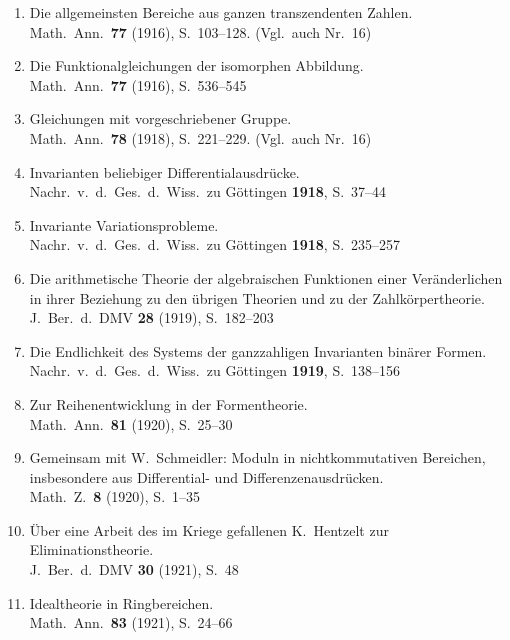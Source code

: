 \documentclass[12pt,a4paper]{article}
\theoremstyle{plain}
\theoremstyle{definition}
\theoremstyle{remark}
\begin{document}
\begin{enumerate}[label={\small\arabic*.},leftmargin=2em,itemsep=0.3em]
\item Die allgemeinsten Bereiche aus ganzen transzendenten Zahlen.\\
Math.\ Ann.\ \textbf{77} (1916), S.~103--128. (Vgl.\ auch Nr.~16)

\item Die Funktionalgleichungen der isomorphen Abbildung.\\
Math.\ Ann.\ \textbf{77} (1916), S.~536--545

\item Gleichungen mit vorgeschriebener Gruppe.\\
Math.\ Ann.\ \textbf{78} (1918), S.~221--229. (Vgl.\ auch Nr.~16)

\item Invarianten beliebiger Differentialausdr\"ucke.\\
Nachr.\ v.\ d.\ Ges.\ d.\ Wiss.\ zu G\"ottingen \textbf{1918}, S.~37--44

\item Invariante Variationsprobleme.\\
Nachr.\ v.\ d.\ Ges.\ d.\ Wiss.\ zu G\"ottingen \textbf{1918}, S.~235--257

\item Die arithmetische Theorie der algebraischen Funktionen einer
Ver\"anderlichen in ihrer Beziehung zu den \"ubrigen Theorien und zu der
Zahlk\"orpertheorie.\\
J.\ Ber.\ d.\ DMV \textbf{28} (1919), S.~182--203

\item Die Endlichkeit des Systems der ganzzahligen Invarianten bin\"arer Formen.\\
Nachr.\ v.\ d.\ Ges.\ d.\ Wiss.\ zu G\"ottingen \textbf{1919}, S.~138--156

\item Zur Reihenentwicklung in der Formentheorie.\\
Math.\ Ann.\ \textbf{81} (1920), S.~25--30

\item Gemeinsam mit W.\ Schmeidler: Moduln in nichtkommutativen Bereichen,
insbesondere aus Differential- und Differenzenausdr\"ucken.\\
Math.\ Z.\ \textbf{8} (1920), S.~1--35

\item \"Uber eine Arbeit des im Kriege gefallenen K.\ Hentzelt zur Eliminationstheorie.\\
J.\ Ber.\ d.\ DMV \textbf{30} (1921), S.~48

\item Idealtheorie in Ringbereichen.\\
Math.\ Ann.\ \textbf{83} (1921), S.~24--66


\end{enumerate}
\end{document}
